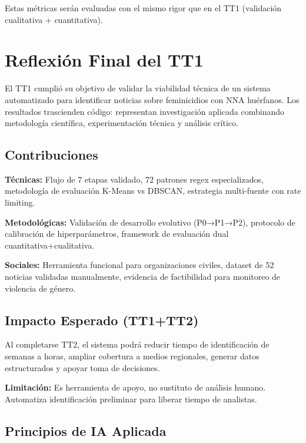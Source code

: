 Estas métricas serán evaluadas con el mismo rigor que en el TT1 (validación cualitativa + cuantitativa).

\section{Reflexión Final del TT1}
\label{sec:reflexion_final}

El TT1 cumplió su objetivo de validar la viabilidad técnica de un sistema automatizado para identificar noticias sobre feminicidios con NNA huérfanos. Los resultados trascienden código: representan investigación aplicada combinando metodología científica, experimentación técnica y análisis crítico.

\subsection{Contribuciones}
\label{subsec:contribuciones}

\textbf{Técnicas:} Flujo de 7 etapas validado, 72 patrones regex especializados, metodología de evaluación K-Means vs DBSCAN, estrategia multi-fuente con rate limiting.

\textbf{Metodológicas:} Validación de desarrollo evolutivo (P0→P1→P2), protocolo de calibración de hiperparámetros, framework de evaluación dual cuantitativa+cualitativa.

\textbf{Sociales:} Herramienta funcional para organizaciones civiles, dataset de 52 noticias validadas manualmente, evidencia de factibilidad para monitoreo de violencia de género.

\subsection{Impacto Esperado (TT1+TT2)}
\label{subsec:impacto_esperado}

Al completarse TT2, el sistema podrá reducir tiempo de identificación de semanas a horas, ampliar cobertura a medios regionales, generar datos estructurados y apoyar toma de decisiones.

\textbf{Limitación:} Es herramienta de apoyo, no sustituto de análisis humano. Automatiza identificación preliminar para liberar tiempo de analistas.

\subsection{Principios de IA Aplicada}
\label{subsec:lecciones_ia}

